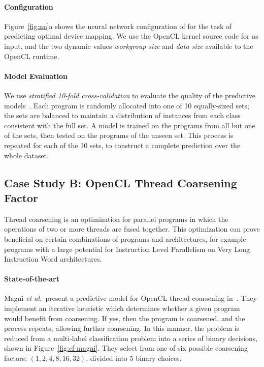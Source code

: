 \paragraph{\DeepTune Configuration} Figure~\ref{fig:nn}a shows the neural network configuration of \DeepTune for the task of predicting optimal device mapping. We use the OpenCL kernel source code for as input, and the two dynamic values \emph{workgroup size} and \emph{data size} available to the OpenCL runtime.

\paragraph{Model Evaluation} We use \emph{stratified 10-fold cross-validation} to evaluate the quality of the predictive models~\cite{Han2011}. Each program is randomly allocated into one of 10 equally-sized sets; the sets are balanced to maintain a distribution of instances from each class consistent with the full set. A model is trained on the programs from all but one of the sets, then tested on the programs of the unseen set. This process is repeated for each of the 10 sets, to construct a complete prediction over the whole dataset.






\subsection{Case Study B: OpenCL Thread Coarsening Factor} \label{subsec:case-study-b}



Thread coarsening is an optimization for parallel programs in which the operations of two or more threads are fused together. This optimization can prove beneficial on certain combinations of programs and architectures, for example programs with a large potential for Instruction Level Parallelism on Very Long Instruction Word architectures.

\paragraph{State-of-the-art} Magni \emph{et al.\ }present a predictive model for OpenCL thread coarsening in~\cite{Magni2014}. They implement an iterative heuristic which determines whether a given program would benefit from coarsening. If yes, then the program is coarsened, and the process repeats, allowing further coarsening. In this manner, the problem is reduced from a multi-label classification problem into a series of binary decisions, shown in Figure~\ref{fig:cf-magni}. They select from one of six possible coarsening factors: $(1, 2, 4, 8, 16, 32)$, divided into 5 binary choices.

